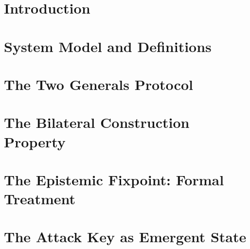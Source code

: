 \documentclass[11pt,a4paper]{article}
\begin{document}
\section{Introduction}
\label{sec:intro}



\section{System Model and Definitions}
\label{sec:model}



\section{The Two Generals Protocol}
\label{sec:protocol}



\section{The Bilateral Construction Property}
\label{sec:bilateral}



\section{The Epistemic Fixpoint: Formal Treatment}
\label{sec:epistemic}



\section{The Attack Key as Emergent State}
\label{sec:emergence}
\end{document}
